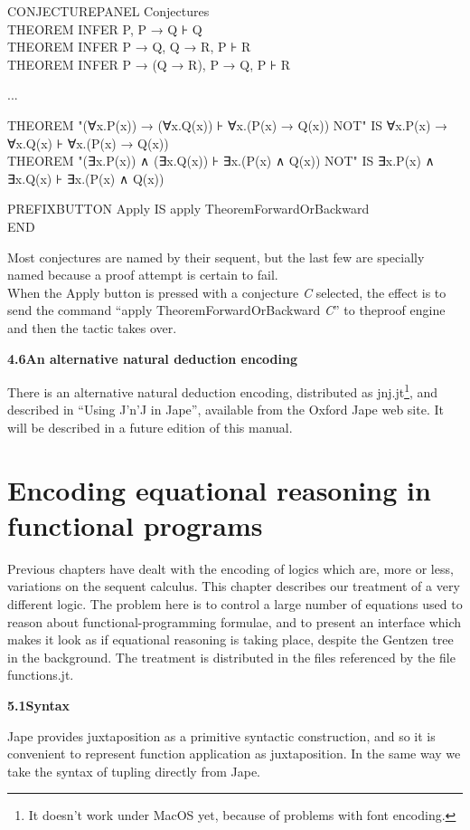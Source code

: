 \documentclass[11pt]{book}
\newcommand{\tab}{\hspace{5mm}}
\begin{document}
CONJECTUREPANEL Conjectures\\
\tab THEOREM INFER P, P → Q ⊦ Q\\
\tab THEOREM INFER P → Q, Q → R, P ⊦ R\\
\tab THEOREM INFER P → (Q → R), P → Q, P ⊦ R

\tab ...

\tab THEOREM "(∀x.P(x)) → (∀x.Q(x)) ⊦ ∀x.(P(x) → Q(x)) NOT" IS ∀x.P(x) → ∀x.Q(x) ⊦ ∀x.(P(x) → Q(x))\\
\tab THEOREM "(∃x.P(x)) ∧ (∃x.Q(x)) ⊦ ∃x.(P(x) ∧ Q(x)) NOT" IS ∃x.P(x) ∧ ∃x.Q(x) ⊦ ∃x.(P(x) ∧ Q(x))

\tab PREFIXBUTTON Apply IS apply TheoremForwardOrBackward\\
\tab END


Most conjectures are named by their sequent, but the last few are specially named because a proof attempt is certain to fail.\\
When the Apply button is pressed with a conjecture \textit{C} selected, the effect is to send the command ``apply TheoremForwardOrBackward \textit{C}'' to theproof engine and then the tactic takes over.


\textbf{{\large 4.6\tab An alternative natural deduction encoding}}


There is an alternative natural deduction encoding, distributed as jnj.jt\footnote{It doesn't work under MacOS yet, because of problems with font encoding.}, and described in ``Using J'n'J in Jape'', available from the Oxford Jape web site. It will be described in a future edition of this manual.



\chapter{Encoding equational reasoning in functional programs}


Previous chapters have dealt with the encoding of logics which are, more or less, variations on the sequent calculus. This chapter describes our treatment of a very different logic. The problem here is to control a large number of equations used to reason about functional-programming formulae, and to present an interface which makes it look as if equational reasoning is taking place, despite the Gentzen tree in the background. The treatment is distributed in the files referenced by the file functions.jt.


\textbf{{\large 5.1\tab Syntax}}


Jape provides juxtaposition as a primitive syntactic construction, and so it is convenient to represent function application as juxtaposition. In the same way we take the syntax of tupling directly from Jape.
\end{document}
